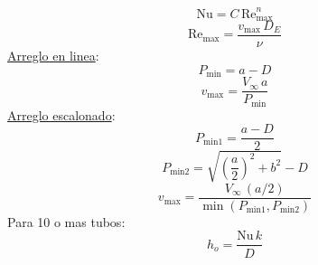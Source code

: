 \documentclass[letter,oneside,10pt]{article}
\begin{document}
\begin{multicols}{3}
\begin{equation*}
    \text{Nu} = C\,\text{Re}_\text{max}^n
\end{equation*}
\vspace{-0.3cm}
\begin{equation*}
    \text{Re}_\text{max} = \frac{v_\text{max}\,D_E}{\nu}
\end{equation*}
\underline{Arreglo en linea}:
\vspace{-0.3cm}
\begin{equation*}
    P_\text{min} = a - D
\end{equation*}
\vspace{-0.3cm}
\begin{equation*}
    v_\text{max} = \frac{V_\infty\,a}{P_\text{min}}
\end{equation*}
\underline{Arreglo escalonado}:
\vspace{-0.3cm}
\begin{equation*}
    P_\text{min1} = \frac{a - D}{2}
\end{equation*}
\vspace{-0.3cm}
\begin{equation*}
    P_\text{min2} = \sqrt{\left(\frac{a}{2}\right)^2 + b^2} - D
\end{equation*}
\vspace{-0.3cm}
\begin{equation*}
    v_\text{max} = \frac{V_\infty\,(a/2)}{\min(P_\text{min1}, P_\text{min2})}
\end{equation*}
Para 10 o mas tubos:
\vspace{-0.3cm}
\begin{equation*}
    h_o = \frac{\text{Nu}\,k}{D}
\end{equation*}

\vspace{-0.5cm}

\end{multicols}
\end{document}

